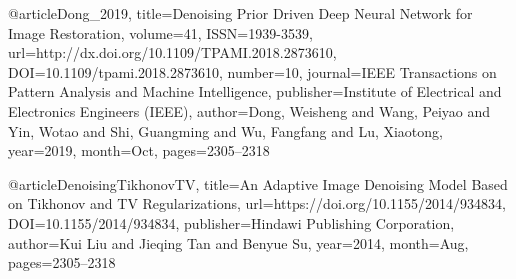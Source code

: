 @article{Dong_2019,
	title={Denoising Prior Driven Deep Neural Network for Image Restoration},
	volume={41},
	ISSN={1939-3539},
	url={http://dx.doi.org/10.1109/TPAMI.2018.2873610},
	DOI={10.1109/tpami.2018.2873610},
	number={10},
	journal={IEEE Transactions on Pattern Analysis and Machine Intelligence},
	publisher={Institute of Electrical and Electronics Engineers (IEEE)},
	author={Dong, Weisheng and Wang, Peiyao and Yin, Wotao and Shi, Guangming and Wu, Fangfang and Lu, Xiaotong},
	year={2019},
	month={Oct},
	pages={2305–2318}
}

@article{DenoisingTikhonovTV,
	title={An Adaptive Image Denoising Model Based on Tikhonov and TV Regularizations},
	url={https://doi.org/10.1155/2014/934834},
	DOI={10.1155/2014/934834},
	publisher={Hindawi Publishing Corporation},
	author={Kui Liu and Jieqing Tan and Benyue Su},
	year={2014},
	month={Aug},
	pages={2305–2318}
}

